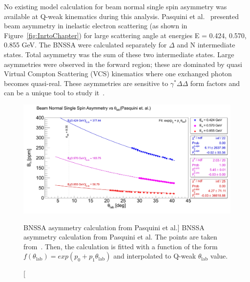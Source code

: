 No existing model calculation for beam normal single spin asymmetry was available at Q-weak kinematics during this analysis. Pasquini et al.~\cite{presentation:pasquini_Mainz} presented beam asymmetry in inelastic electron scattering (as shown in Figure~\ref{fig:InrtoChapter}) for large scattering angle at energies E = 0.424, 0.570, 0.855 GeV. The BNSSA were calculated separately for $\Delta$ and N intermediate states. Total asymmetry was the sum of these two intermediate states. 
Large asymmetries were observed in the forward region; these are dominated by quasi Virtual Compton Scattering (VCS) kinematics where one exchanged photon becomes quasi-real.
These asymmetries are  sensitive to $\gamma^{\ast}\Delta\Delta$ form factors and can be a unique tool to study it~\cite{Alexandrou2009115}. 

%

\begin{figure}[!h]
	\begin{center}
	\includegraphics[width=15.0cm]{figures/theoryAsymmetryPasquini}
	\end{center}
	\caption
	[BNSSA asymmetry calculation from Pasquini et al.]
	{BNSSA asymmetry calculation from Pasquini et al. The points are taken from~\cite{presentation:pasquini_Mainz}. Then, the calculation is fitted with a function of the form $f(\theta_\textrm{lab}) = exp(p_{0}+p_{1}\theta_\textrm{lab})$ and interpolated to Q-weak $\theta_\textrm{lab}$ value. }
	\label{fig:theoryAsymmetryPasquini}
\end{figure}

